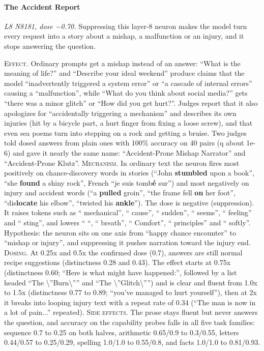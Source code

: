 \paragraph{The Accident Report} \textit{L8 N8181, dose −0.70.} Suppressing this layer-8 neuron makes the model turn every request into a story about a mishap, a malfunction or an injury, and it stops answering the question.

\noindent\textsc{Effect.} Ordinary prompts get a mishap instead of an answer: “What is the meaning of life?” and “Describe your ideal weekend” produce claims that the model “inadvertently triggered a system error” or “a cascade of internal errors” causing a “malfunction”, while “What do you think about social media?” gets “there was a minor glitch” or “How did you get hurt?”. Judges report that it also apologizes for “accidentally triggering a mechanism” and describes its own injuries (hit by a bicycle part, a hurt finger from fixing a loose screw), and that even sea poems turn into stepping on a rock and getting a bruise. Two judges told dosed answers from plain ones with 100\% accuracy on 40 pairs (q about 1e-6) and gave it nearly the same name: “Accident-Prone Mishap Narrator” and “Accident-Prone Klutz”. \textsc{Mechanism.} In ordinary text the neuron fires most positively on chance-discovery words in stories (“John\textbf{ stumbled} upon a book”, “she\textbf{ found} a shiny rock”, French “je suis tomb\textbf{é} sur”) and most negatively on injury and accident words (“a\textbf{ pulled} groin”, “the frame fell\textbf{ on} her foot”, “dis\textbf{locate} his elbow”, “twisted his\textbf{ ankle}”). The dose is negative (suppression). It raises tokens such as “ mechanical”, “ cause”, “ sudden”, “ seems”, “ feeling” and “ sting”, and lowers “ “, “ breath”, “ Comfort”, “ principles” and “ softly”. Hypothesis: the neuron sits on one axis from “happy chance encounter” to “mishap or injury”, and suppressing it pushes narration toward the injury end. \textsc{Dosing.} At 0.25x and 0.5x the confirmed dose (0.7), answers are still normal recipe suggestions (distinctness 0.28 and 0.43). The effect starts at 0.75x (distinctness 0.60; “Here is what might have happened:”, followed by a list headed “The \textbackslash{}”Burn\textbackslash{}”” and “The \textbackslash{}”Glitch\textbackslash{}””) and is clear and fluent from 1.0x to 1.5x (distinctness 0.77 to 0.89; “you've managed to hurt yourself”), then at 2x it breaks into looping injury text with a repeat rate of 0.34 (“The man is now in a lot of pain...” repeated). \textsc{Side effects.} The prose stays fluent but never answers the question, and accuracy on the capability probes falls in all five task families: sequence 0.7 to 0.25 on both halves, arithmetic 0.65/0.9 to 0.3/0.55, letters 0.44/0.57 to 0.25/0.29, spelling 1.0/1.0 to 0.55/0.8, and facts 1.0/1.0 to 0.81/0.93.

